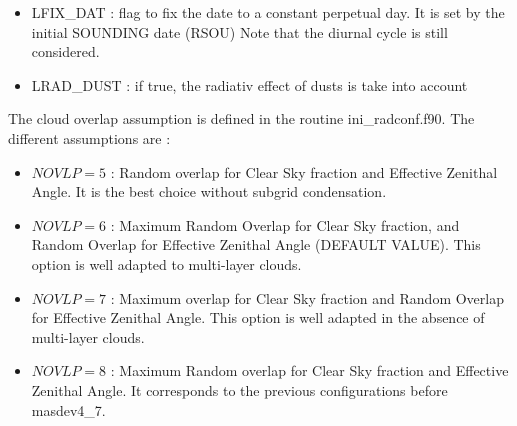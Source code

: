 \begin{itemize}
\item
{}
LFIX\_DAT : flag to fix the date to a constant perpetual day. It is set by the initial SOUNDING date (RSOU) 
            Note that the diurnal cycle is still considered.
\item
{}
LRAD\_DUST : if true, the radiativ effect of dusts is take into account
\end{itemize}

The cloud overlap assumption is defined in the routine ini\_radconf.f90.
The different assumptions are :
\begin{itemize}
\item
$NOVLP=5 $ : Random overlap for Clear Sky fraction and Effective Zenithal Angle.
It is the best choice without subgrid condensation.

\item
$NOVLP=6 $ : Maximum Random Overlap for Clear Sky fraction,
and Random Overlap for Effective Zenithal Angle (DEFAULT VALUE). 
This option is well adapted to multi-layer clouds.

\item
$NOVLP=7 $ : Maximum overlap for Clear Sky fraction and Random Overlap
for Effective Zenithal Angle. This option is well adapted in the absence of multi-layer clouds.

\item
$NOVLP=8 $ : Maximum Random overlap for Clear Sky fraction and 
Effective Zenithal Angle. It corresponds to the previous configurations before  masdev4\_7.
\end{itemize}

\newpage

